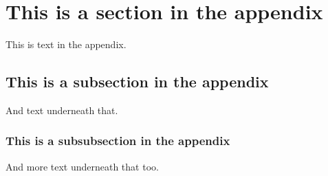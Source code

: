 
\section{This is a section in the appendix}
\label{a1:new_section}

This is text in the appendix.

\subsection{This is a subsection in the appendix}

And text underneath that.

\subsubsection{This is a subsubsection in the appendix}

And more text underneath that too.